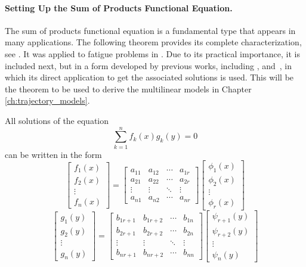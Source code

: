 \paragraph{Setting Up the Sum of Products Functional Equation.}
The sum of products functional equation is a fundamental type that appears in many applications. The following theorem provides its complete characterization, see \cite{aczel1964functional}. It was applied to fatigue problems in \cite{Castillo85a}. Due to its practical importance, it is included next, but in a form developed by previous works, including \cite{castillo2004functional}, \cite{castillo1992functional} and~\cite{CastilloRuiz1993}, in which its direct application to get the associated solutions is used. This will be the theorem to be used to derive the multilinear models in Chapter \ref{ch:trajectory_models}.
\begin{theorem}\label{th:sumprod}
All solutions of the equation
\begin{equation}\label{ecu:sumprod}
\sum_{k=1}^{n} f_k(x)g_k(y) = 0
\end{equation}
can be written in the form
$$\begin{bmatrix} f_1(x) \\ f_2(x) \\ \vdots \\ f_n(x) \end{bmatrix} = \begin{bmatrix} a_{11} & a_{12} & \cdots & a_{1r} \\ a_{21} & a_{22} & \cdots & a_{2r} \\ \vdots & \vdots & \ddots & \vdots \\ a_{n1} & a_{n2} & \cdots & a_{nr} \end{bmatrix} \begin{bmatrix} \phi_1(x) \\ \phi_2(x) \\ \vdots \\ \phi_r(x) \end{bmatrix}$$
$$\begin{bmatrix} g_1(y) \\ g_2(y) \\ \vdots \\ g_n(y) \end{bmatrix} = \begin{bmatrix} b_{1r+1} & b_{1r+2} & \cdots & b_{1n} \\ b_{2r+1} & b_{2r+2} & \cdots & b_{2n} \\ \vdots & \vdots & \ddots & \vdots \\ b_{nr+1} & b_{nr+2} & \cdots & b_{nn} \end{bmatrix} \begin{bmatrix} \psi_{r+1}(y) \\ \psi_{r+2}(y) \\ \vdots \\ \psi_n(y) \end{bmatrix}$$

\end{theorem}
